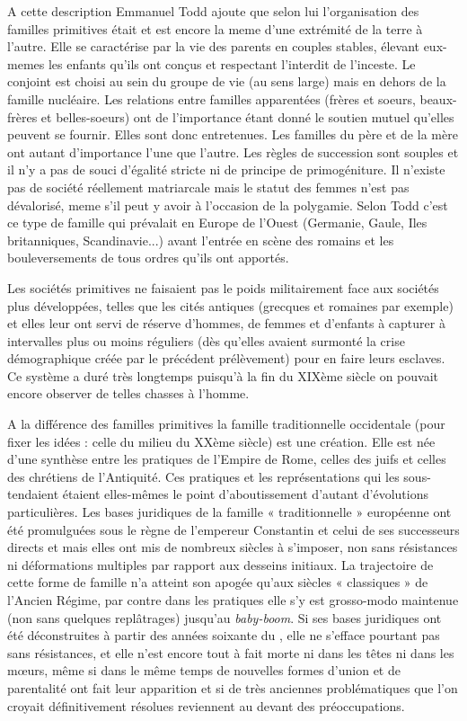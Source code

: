 A cette description Emmanuel Todd ajoute que selon lui l'organisation des familles primitives était et est encore la meme d'une extrémité de la terre à l'autre. Elle se caractérise par la vie des parents en couples stables, élevant eux-memes les enfants qu'ils ont conçus et respectant l'interdit de l'inceste. Le conjoint est choisi au sein du groupe de vie (au sens large) mais en dehors de la famille nucléaire. Les relations entre familles apparentées (frères et soeurs, beaux-frères et belles-soeurs) ont de l'importance étant donné le soutien mutuel qu'elles peuvent se fournir. Elles sont donc entretenues. Les familles du père et de la mère ont autant d'importance l'une que l'autre. Les règles de succession sont souples et il n'y a pas de souci d'égalité stricte ni de principe de primogéniture. Il n'existe pas de société réellement matriarcale mais le statut des femmes n'est pas dévalorisé, meme s'il peut y avoir à l'occasion de la polygamie. Selon Todd c'est ce type de famille qui prévalait en Europe de l'Ouest (Germanie, Gaule, Iles britanniques, Scandinavie...) avant l'entrée en scène des romains et les bouleversements de tous ordres qu'ils ont apportés. 

Les sociétés primitives ne faisaient pas le poids militairement face aux sociétés plus développées, telles que les cités antiques (grecques et romaines par exemple) et elles leur ont servi de réserve d'hommes, de femmes et d'enfants à capturer à intervalles plus ou moins réguliers (dès qu'elles avaient surmonté la crise démographique créée par le précédent prélèvement) pour en faire leurs esclaves. Ce système a duré très longtemps puisqu'à la fin du XIXème siècle on pouvait encore observer de telles chasses à l'homme.


A la différence des familles primitives la famille traditionnelle occidentale (pour fixer les idées : celle du milieu du XXème siècle) est une création. Elle est
née d'une synthèse entre les pratiques de l'Empire de Rome, celles des
juifs et celles des chrétiens de l'Antiquité. Ces pratiques et les représentations
qui les sous-tendaient étaient elles-mêmes le point d'aboutissement
d'autant d'évolutions particulières.
Les bases juridiques de la famille « traditionnelle » européenne ont été promulguées sous le règne
de l'empereur Constantin et celui de ses successeurs directs et  mais elles ont mis de nombreux
siècles à s'imposer, non sans résistances ni déformations multiples par
rapport aux desseins initiaux. La trajectoire de cette forme de famille n'a atteint son apogée qu'aux
siècles « classiques » de l'Ancien Régime, par contre dans les pratiques elle s'y est grosso-modo maintenue  (non sans quelques replâtrages) jusqu'au
\emph{baby-boom}.  Si ses bases juridiques ont été déconstruites à partir des années soixante du , elle ne s'efface pourtant pas sans résistances, et elle n'est encore tout à fait morte ni dans les têtes ni dans les mœurs, même si dans le même temps de nouvelles formes d'union et de parentalité ont fait leur apparition et si de très anciennes problématiques que l'on croyait définitivement résolues reviennent au devant des préoccupations. 

